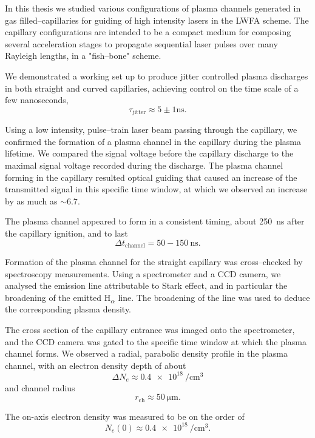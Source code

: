 \documentclass[../main.tex]{subfiles}
\begin{document}
In this thesis we studied various configurations of plasma channels generated in gas filled--capillaries for guiding of high intensity lasers in the LWFA scheme. The capillary configurations are intended to be a compact medium for composing several acceleration stages to propagate sequential laser pulses over many Rayleigh lengths, in a "fish--bone" scheme.

We demonstrated a working set up to produce jitter controlled plasma discharges in both straight and curved capillaries, achieving control on the time scale of a few nanoseconds,
\begin{equation*}
    	\tau_\text{jitter}\approx 5\pm 1\si{\ns}.
\end{equation*}

Using a low intensity, pulse--train laser beam passing through the capillary, we confirmed the formation of a plasma channel in the capillary during the plasma lifetime. We compared the signal voltage before the capillary discharge to the maximal signal voltage recorded during the discharge. The plasma channel forming in the capillary resulted optical guiding that caused an increase of the transmitted signal in this specific time window, at which we observed an increase by as much as $\sim 6.7$.

The plasma channel appeared to form in a consistent timing, about \SI{250}{\ns} after the capillary ignition, and to last 
\begin{equation*}
    \Delta t_\text{channel}=50-150\ \si{\ns}.
\end{equation*}

Formation of the plasma channel for the straight capillary was cross--checked by spectroscopy measurements. Using a spectrometer and a CCD camera, we analysed the emission line attributable to Stark effect, and in particular the broadening of the emitted H\textsubscript{$\alpha$} line. The broadening of the line was used to deduce the corresponding plasma density.

The cross section of the capillary entrance was imaged onto the spectrometer, and the CCD camera was gated to the specific time window at which the plasma channel forms. We observed a radial, parabolic density profile in the plasma channel, with an electron density depth of about 
$$\Delta N_e \approx\SI{0.4e18}{\per\cubic\cm}$$
and channel radius
$$r_\text{ch}\approx \SI{50}{\um}.$$

The on-axis electron density was measured to be on the order of $$N_e(0)\approx \SI{0.4e18}{\per\cubic\cm}.$$
\end{document}
